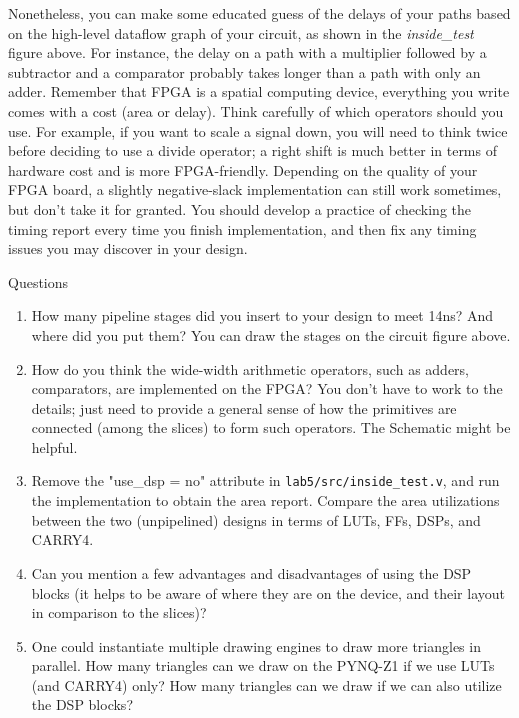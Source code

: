 \documentclass[11pt]{article}
\makeatletter
\renewcommand{\subsection}
{\@startsection {subsection}{1}{0pt}
 {-1ex}
 {0.5ex}
 {\bfseries\normalsize}}
\makeatother
\begin{document}
Nonetheless, you can make some educated guess of the delays of your paths based on the high-level dataflow graph of your circuit, as shown in the \textit{inside\_test} figure above. For instance, the delay on a path with a multiplier followed by a subtractor and a comparator probably takes longer than a path with only an adder. Remember that FPGA is a spatial computing device, everything you write comes with a cost (area or delay). Think carefully of which operators should you use. For example, if you want to scale a signal down, you will need to think twice before deciding to use a divide operator; a right shift is much better in terms of hardware cost and is more FPGA-friendly. Depending on the quality of your FPGA board, a slightly negative-slack implementation can still work sometimes, but don't take it for granted. You should develop a practice of checking the timing report every time you finish implementation, and then fix any timing issues you may discover in your design.

\subsection{Questions}\label{sec:Q2}
\begin{enumerate}
\item How many pipeline stages did you insert to your design to meet 14ns? And where did you put them? You can draw the stages on the circuit figure above.
\item How do you think the wide-width arithmetic operators, such as adders, comparators, are implemented on the FPGA? You don't have to work to the details; just need to provide a general sense of how the primitives are connected (among the slices) to form such operators. The Schematic might be helpful.
\item Remove the "use\_dsp = no" attribute in \verb|lab5/src/inside_test.v|, and run the implementation to obtain the area report. Compare the area utilizations between the two (unpipelined) designs in terms of LUTs, FFs, DSPs, and CARRY4.
\item Can you mention a few advantages and disadvantages of using the DSP blocks (it helps to be aware of where they are on the device, and their layout in comparison to the slices)?
\item One could instantiate multiple drawing engines to draw more triangles in parallel. How many triangles can we draw on the PYNQ-Z1 if we use LUTs (and CARRY4) only? How many triangles can we draw if we can also utilize the DSP blocks?
\end{enumerate}
\end{document}
